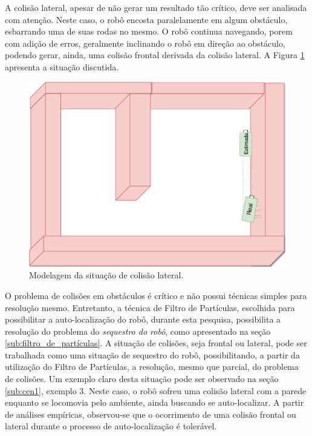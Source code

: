 A colisão lateral, apesar de não gerar um resultado tão crítico, deve ser analisada com atenção. Neste caso, o robô encosta paralelamente em algum
obstáculo, esbarrando uma de suas rodas no mesmo. O robô continua navegando, porem com adição de erros, geralmente inclinando
o robô em direção ao obstáculo, podendo gerar, ainda, uma colisão frontal derivada da colisão lateral. A Figura \ref{img:colisao_lateral}
apresenta a situação discutida.

\begin{figure}[H]
  \centering
  \includegraphics[scale=0.5]{figuras/colisao_lateral.eps}
  \caption{Modelagem da situação de colisão lateral.}
  \label{img:colisao_lateral}
\end{figure}

O problema de colisões em obstáculos é crítico e não possui técnicas simples para resolução mesmo. Entretanto, a técnica de Filtro
de Partículas, escolhida para possibilitar a auto-localização do robô, durante esta pesquisa,
possibilita a resolução do problema do \textit{sequestro do robô}, como apresentado na seção \ref{sub:filtro_de_partículas}. A situação
de colisões, seja frontal ou lateral, pode ser trabalhada como uma situação de sequestro do robô, possibilitando, a partir da utilização
do Filtro de Partículas, a resolução, mesmo que parcial, do problema de colisões. Um exemplo claro desta situação pode ser observado
na seção \ref{sub:cen1}, exemplo 3. Neste caso, o robô sofreu uma colisão lateral com a parede enquanto se locomovia pelo ambiente,
ainda buscando se auto-localizar. A partir de análises empíricas, observou-se que o ocorrimento de uma colisão frontal ou lateral durante
o processo de auto-localização é tolerável.

